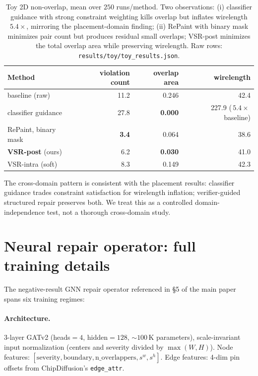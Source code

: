 \documentclass{article}
\begin{document}
\begin{table}[h]
\centering
\small
\begin{tabular}{lrrr}
\toprule
Method & violation count & overlap area & wirelength \\
\midrule
baseline (raw)         & 11.2  & 0.246  & 42.4 \\
classifier guidance    & 27.8  & \textbf{0.000} & 227.9 ($\,5.4\times\,$baseline) \\
RePaint, binary mask   & \textbf{3.4}   & 0.064  & 38.6 \\
\textbf{VSR-post} (ours) & 6.2 & \textbf{0.030} & 41.0 \\
VSR-intra (soft)       & 8.3   & 0.149  & 42.3 \\
\bottomrule
\end{tabular}
\caption{Toy 2D non-overlap, mean over $250$ runs/method.  Two observations:
(i) classifier guidance with strong constraint weighting kills overlap but
inflates wirelength $5.4\times$, mirroring the placement-domain finding;
(ii) RePaint with binary mask minimizes pair count but produces residual
small overlaps; VSR-post minimizes the total overlap area while preserving
wirelength.  Raw rows: \texttt{results/toy/toy\_results.json}.}
\label{tab:supp-toy}
\end{table}

The cross-domain pattern is consistent with the placement results:
classifier guidance trades constraint satisfaction for wirelength inflation;
verifier-guided structured repair preserves both.  We treat this as a
controlled domain-independence test, not a thorough cross-domain study.

\section{Neural repair operator: full training details}
\label{sec:supp-neural}

The negative-result GNN repair operator referenced in \S5 of the main paper
spans six training regimes:

\paragraph{Architecture.} 3-layer GATv2 (heads$=4$, hidden$=128$, $\sim 100$\,K
parameters), scale-invariant input normalization (centers and severity divided
by $\max(W, H)$).  Node features:
$[\mathrm{severity}, \mathrm{boundary}, \mathrm{n\_overlappers}, s^w, s^h]$.
Edge features: 4-dim pin offsets from ChipDiffusion's \texttt{edge\_attr}.
\end{document}
